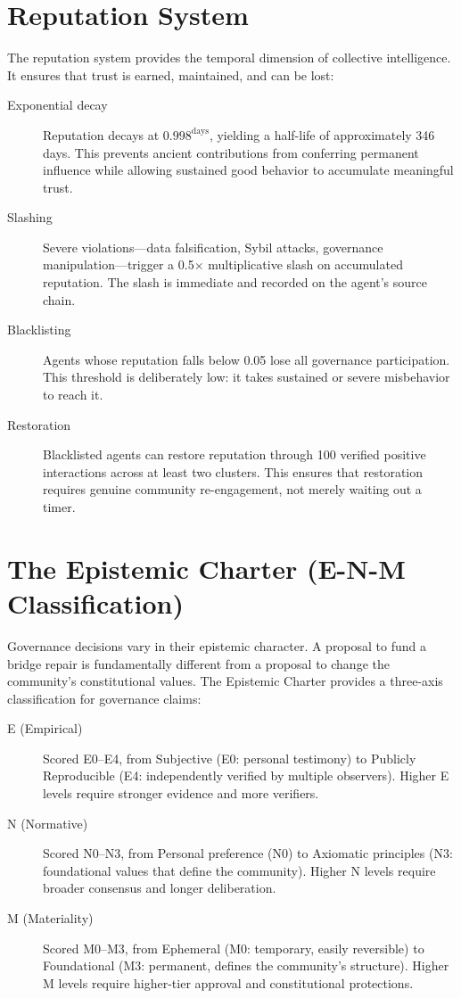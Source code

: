\documentclass[12pt]{book}
\begin{document}
\section{Reputation System}

The reputation system provides the temporal dimension of collective intelligence.
It ensures that trust is earned, maintained, and can be lost:

\begin{description}
  \item[Exponential decay] Reputation decays at $0.998^{\text{days}}$, yielding
    a half-life of approximately 346 days. This prevents ancient contributions
    from conferring permanent influence while allowing sustained good behavior
    to accumulate meaningful trust.
  \item[Slashing] Severe violations---data falsification, Sybil attacks,
    governance manipulation---trigger a 0.5$\times$ multiplicative slash on
    accumulated reputation. The slash is immediate and recorded on the agent's
    source chain.
  \item[Blacklisting] Agents whose reputation falls below 0.05 lose all
    governance participation. This threshold is deliberately low: it takes
    sustained or severe misbehavior to reach it.
  \item[Restoration] Blacklisted agents can restore reputation through 100
    verified positive interactions across at least two clusters. This ensures
    that restoration requires genuine community re-engagement, not merely
    waiting out a timer.
\end{description}

\section{The Epistemic Charter (E-N-M Classification)}

Governance decisions vary in their epistemic character. A proposal to fund a
bridge repair is fundamentally different from a proposal to change the community's
constitutional values. The Epistemic Charter provides a three-axis classification
for governance claims:

\begin{description}
  \item[E (Empirical)] Scored E0--E4, from Subjective (E0: personal testimony)
    to Publicly Reproducible (E4: independently verified by multiple observers).
    Higher E levels require stronger evidence and more verifiers.
  \item[N (Normative)] Scored N0--N3, from Personal preference (N0) to Axiomatic
    principles (N3: foundational values that define the community). Higher N
    levels require broader consensus and longer deliberation.
  \item[M (Materiality)] Scored M0--M3, from Ephemeral (M0: temporary, easily
    reversible) to Foundational (M3: permanent, defines the community's
    structure). Higher M levels require higher-tier approval and constitutional
    protections.
\end{description}
\end{document}
